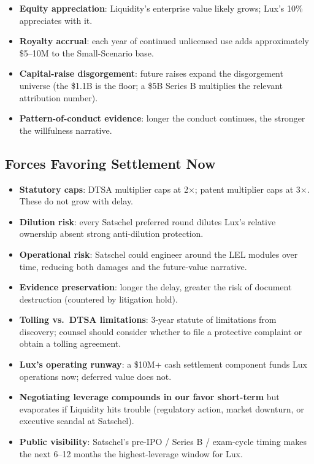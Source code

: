 \documentclass[11pt,letterpaper]{article}
\begin{document}
\begin{itemize}[leftmargin=1.5em,itemsep=0.1em]
\item \textbf{Equity appreciation}: Liquidity's enterprise value
likely grows; Lux's 10\% appreciates with it.
\item \textbf{Royalty accrual}: each year of continued unlicensed
use adds approximately \$5--10M to the Small-Scenario base.
\item \textbf{Capital-raise disgorgement}: future raises expand the
disgorgement universe (the \$1.1B is the floor; a \$5B Series B
multiplies the relevant attribution number).
\item \textbf{Pattern-of-conduct evidence}: longer the conduct
continues, the stronger the willfulness narrative.
\end{itemize}

\subsection*{Forces Favoring Settlement Now}

\begin{itemize}[leftmargin=1.5em,itemsep=0.1em]
\item \textbf{Statutory caps}: DTSA multiplier caps at 2$\times$;
patent multiplier caps at 3$\times$. These do not grow with delay.
\item \textbf{Dilution risk}: every Satschel preferred round dilutes
Lux's relative ownership absent strong anti-dilution protection.
\item \textbf{Operational risk}: Satschel could engineer around the
LEL modules over time, reducing both damages and the future-value
narrative.
\item \textbf{Evidence preservation}: longer the delay, greater the
risk of document destruction (countered by litigation hold).
\item \textbf{Tolling vs.\ DTSA limitations}: 3-year statute of
limitations from discovery; counsel should consider whether to file a
protective complaint or obtain a tolling agreement.
\item \textbf{Lux's operating runway}: a \$10M+ cash settlement
component funds Lux operations now; deferred value does not.
\item \textbf{Negotiating leverage compounds in our favor short-term}
but evaporates if Liquidity hits trouble (regulatory action, market
downturn, or executive scandal at Satschel).
\item \textbf{Public visibility}: Satschel's pre-IPO / Series B /
exam-cycle timing makes the next 6--12 months the highest-leverage
window for Lux.
\end{itemize}
\end{document}
